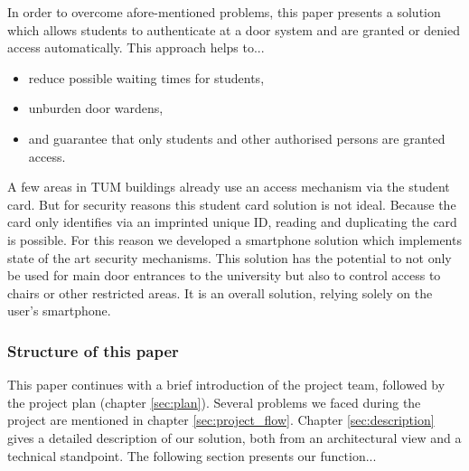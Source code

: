 In order to overcome afore-mentioned problems, this paper presents a solution which allows students to authenticate at a door system and are granted or denied access automatically. This approach helps to...

\begin{itemize}
\item reduce possible waiting times for students,
\item unburden door wardens,
\item and guarantee that only students and other authorised persons are granted access.
\end{itemize}

A few areas in TUM buildings already use an access mechanism via the student card.
But for security reasons this student card solution is not ideal.
Because the card only identifies via an imprinted unique ID, reading and duplicating the card is possible.
For this reason we developed a smartphone solution which implements state of the art security mechanisms.
This solution has the potential to not only be used for main door entrances to the university but also to control access to chairs or other restricted areas.
It is an overall solution, relying solely on the user's smartphone.
 
 \subsubsection*{Structure of this paper}

This paper continues with a brief introduction of the project team, followed by the project plan (chapter \ref{sec:plan}).
Several problems we faced during the project are mentioned in chapter \ref{sec:project_flow}.
Chapter \ref{sec:description} gives a detailed description of our \app solution, both from an architectural view and a technical standpoint.
The following section presents our function... 


